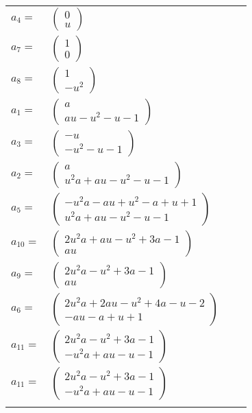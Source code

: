 \documentclass[1p]{elsarticle_modified}
\theoremstyle{definition}
\begin{document}
\begin{tabular}{m{7pt} m{180pt} m{7pt} m{180pt} }
\flushright $a_{4}=$&$\begin{pmatrix}0\\u\end{pmatrix}$ \\
\flushright $a_{7}=$&$\begin{pmatrix}1\\0\end{pmatrix}$ \\
\flushright $a_{8}=$&$\begin{pmatrix}1\\- u^2\end{pmatrix}$ \\
\flushright $a_{1}=$&$\begin{pmatrix}a\\a u- u^2- u-1\end{pmatrix}$ \\
\flushright $a_{3}=$&$\begin{pmatrix}- u\\- u^2- u-1\end{pmatrix}$ \\
\flushright $a_{2}=$&$\begin{pmatrix}a\\u^2 a+a u- u^2- u-1\end{pmatrix}$ \\
\flushright $a_{5}=$&$\begin{pmatrix}- u^2 a- a u+u^2- a+u+1\\u^2 a+a u- u^2- u-1\end{pmatrix}$ \\
\flushright $a_{10}=$&$\begin{pmatrix}2 u^2 a+a u- u^2+3 a-1\\a u\end{pmatrix}$ \\
\flushright $a_{9}=$&$\begin{pmatrix}2 u^2 a- u^2+3 a-1\\a u\end{pmatrix}$ \\
\flushright $a_{6}=$&$\begin{pmatrix}2 u^2 a+2 a u- u^2+4 a- u-2\\- a u- a+u+1\end{pmatrix}$ \\
\flushright $a_{11}=$&$\begin{pmatrix}2 u^2 a- u^2+3 a-1\\- u^2 a+a u- u-1\end{pmatrix}$\\ \flushright $a_{11}=$&$\begin{pmatrix}2 u^2 a- u^2+3 a-1\\- u^2 a+a u- u-1\end{pmatrix}$\\&\end{tabular}
\end{document}
